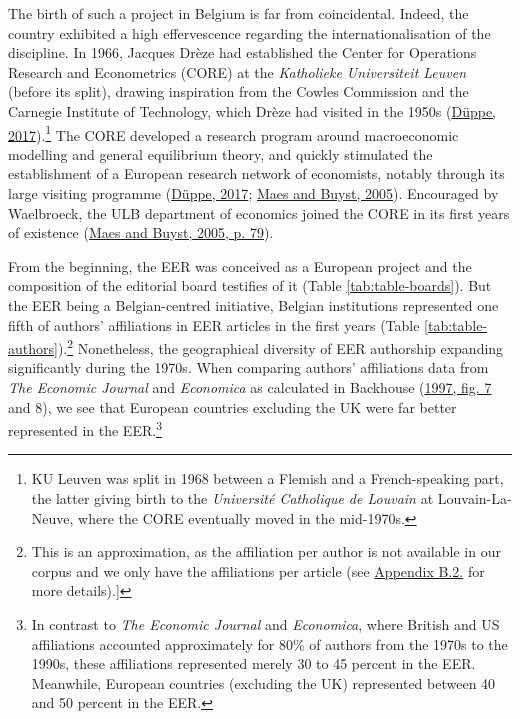 \documentclass[
  12pt,
  onecolumn]{article}
\begin{document}
The birth of such a project in Belgium is far from coincidental. Indeed,
the country exhibited a high effervescence regarding the
internationalisation of the discipline. In 1966, Jacques Drèze had
established the Center for Operations Research and Econometrics (CORE)
at the \emph{Katholieke Universiteit Leuven} (before its split), drawing
inspiration from the Cowles Commission and the Carnegie Institute of
Technology, which Drèze had visited in the 1950s
(\protect\hyperlink{ref-duppe2017}{Düppe, 2017}).\footnote{KU Leuven was
  split in 1968 between a Flemish and a French-speaking part, the latter
  giving birth to the \emph{Université Catholique de Louvain} at
  Louvain-La-Neuve, where the CORE eventually moved in the mid-1970s.}
The CORE developed a research program around macroeconomic modelling and
general equilibrium theory, and quickly stimulated the establishment of
a European research network of economists, notably through its large
visiting programme (\protect\hyperlink{ref-duppe2017}{Düppe, 2017};
\protect\hyperlink{ref-maes2005}{Maes and Buyst, 2005}). Encouraged by
Waelbroeck, the ULB department of economics joined the CORE in its first
years of existence (\protect\hyperlink{ref-maes2005}{Maes and Buyst,
2005, p. 79}).

From the beginning, the EER was conceived as a European project and the
composition of the editorial board testifies of it (Table
\ref{tab:table-boards}). But the EER being a Belgian-centred initiative,
Belgian institutions represented one fifth of authors' affiliations in
EER articles in the first years (Table
\ref{tab:table-authors}).\footnote{This is an approximation, as the
  affiliation per author is not available in our corpus and we only have
  the affiliations per article (see
  \protect\hyperlink{author-affiliation}{Appendix B.2.} for more
  details).{]}} Nonetheless, the geographical diversity of EER
authorship expanding significantly during the 1970s. When comparing
authors' affiliations data from \emph{The Economic Journal} and
\emph{Economica} as calculated in Backhouse
(\protect\hyperlink{ref-backhouse1997a}{1997, fig. 7} and 8), we see
that European countries excluding the UK were far better represented in
the EER.\footnote{In contrast to \emph{The Economic Journal} and
  \emph{Economica}, where British and US affiliations accounted
  approximately for 80\% of authors from the 1970s to the 1990s, these
  affiliations represented merely 30 to 45 percent in the EER.
  Meanwhile, European countries (excluding the UK) represented between
  40 and 50 percent in the EER.}
\end{document}
